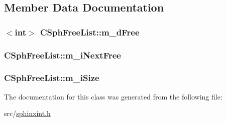 \subsection{Member Data Documentation}
\hypertarget{classCSphFreeList_a91ad8304b4799ac956a2265db527a643}{
\subsubsection[{m\-\_\-d\-Free}]{$<${\bf int}$>$ C\-Sph\-Free\-List\-::m\-\_\-d\-Free\hspace{0.3cm}{\ttfamily [private]}}}\label{classCSphFreeList_a91ad8304b4799ac956a2265db527a643}
\hypertarget{classCSphFreeList_a5643145c0784c147e431092808855402}{
\subsubsection[{m\-\_\-i\-Next\-Free}]{ C\-Sph\-Free\-List\-::m\-\_\-i\-Next\-Free\hspace{0.3cm}{\ttfamily [private]}}}\label{classCSphFreeList_a5643145c0784c147e431092808855402}
\hypertarget{classCSphFreeList_a8d56e2f416d19cdd266dd867062c58f2}{
\subsubsection[{m\-\_\-i\-Size}]{ C\-Sph\-Free\-List\-::m\-\_\-i\-Size\hspace{0.3cm}{\ttfamily [private]}}}\label{classCSphFreeList_a8d56e2f416d19cdd266dd867062c58f2}


The documentation for this class was generated from the following file\-:\begin{DoxyCompactItemize}
\item 
src/\hyperlink{sphinxint_8h}{sphinxint.\-h}\end{DoxyCompactItemize}
